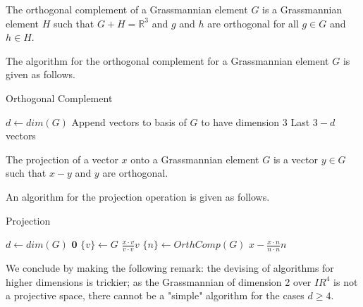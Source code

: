 \documentclass[12pt]{article}
\newcommand{\R}{\mathbb{R}}
\newenvironment{definition}[2][Definition]{\begin{trivlist}
\item[\hskip \labelsep {\bfseries #1}\hskip \labelsep {\bfseries #2.}]}{\end{trivlist}}
\newenvironment{proposition}[2][Proposition]{\begin{trivlist}
\item[\hskip \labelsep {\bfseries #1}\hskip \labelsep {\bfseries #2.}]}{\end{trivlist}}
\begin{document}
\begin{definition}{4.1}
The orthogonal complement of a Grassmannian element \(G\) is a Grassmannian element \(H\) such that \(G + H = \R^3\) and \(g\) and \(h\) are orthogonal for all \(g \in G\) and \(h \in H\).
\end{definition}

\begin{proposition}{4.2}
The algorithm for the orthogonal complement for a Grassmannian element \(G\) is given as follows.

\begin{algorithm}[H]
\caption{Orthogonal Complement}
\begin{algorithmic}[5]
\State $d \gets dim(G)$
\State Append vectors to basis of $G$ to have dimension 3
\Return Last $3-d$ vectors
\EndProcedure
\end{algorithmic}
\end{algorithm}

\end{proposition}

\begin{definition}{5.1} 
The projection of a vector \(x\) onto a Grassmannian element \(G\) is a vector \(y \in G\) such that \(x-y\) and \(y\) are orthogonal.
\end{definition}

\begin{proposition}{5.2}
An algorithm for the projection operation is given as follows.

\begin{algorithm}
\caption{Projection}
\begin{algorithmic}[6]
\State $d \gets dim(G)$
\Return $\mathbf{0}$
\State $\{v\} \gets G$ 
\Return $\frac{x \cdot v}{v \cdot v}v$
\State $\{n\} \gets OrthComp(G)$
\Return $x - \frac{x \cdot n}{n \cdot n}n$
\EndIf
\EndProcedure
\end{algorithmic}
\end{algorithm}
\end{proposition}

We conclude by making the following remark: the devising of algorithms for higher dimensions is trickier; as the Grassmannian of dimension 2 over \(IR^4\) is not a projective space, there cannot be a "simple" algorithm for the cases \(d \geq 4\). 



\end{document}
